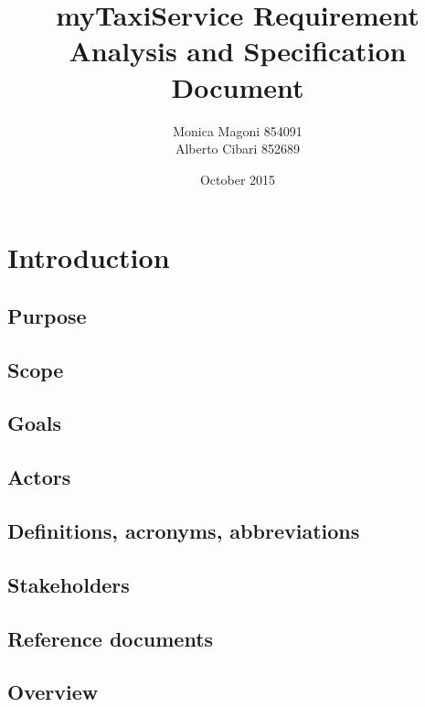\documentclass{article}
\title{
	\Huge{\textbf{myTaxiService}}
	\newline
	\huge{\textbf{R}equirement \textbf{A}nalysis and \textbf{S}pecification \textbf{D}ocument}
}
\author{
	Monica Magoni 854091
	\\
	Alberto Cibari 852689
}
\date{October 2015}
\begin{document}
	\maketitle
	\newpage
	\renewcommand*\contentsname{\Huge{Summary}}
	\tableofcontents
	
	\newpage
	
\section{Introduction}
	
	\subsection{Purpose}
	
	
	\subsection{Scope}
	
	
	\subsection{Goals}
	
	
	\subsection{Actors}
	
	
	\subsection{Definitions, acronyms, abbreviations}
	
	
	\subsection{Stakeholders}
	
	
	\subsection{Reference documents}
	

	\subsection{Overview}
	
	
\end{document}
